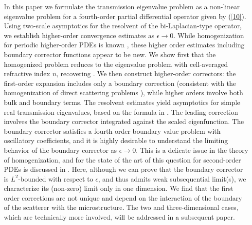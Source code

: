 \documentclass[12pt]{article}
\begin{document}
\medskip
\noindent
In this paper we formulate the transmission eigenvalue problem as a non-linear eigenvalue problem for a fourth-order partial differential operator given by (\ref{10}). Using two-scale asymptotics for the resolvent of the bi-Laplacian-type operator, we establish higher-order convergence estimates as $\epsilon \to 0$. While homogenization for periodic higher-order PDEs is known \cite{ Fr, high2, high,Pa}, these higher order estimates including boundary corrector functions appear to be new. We show first that the homogenized problem reduces to the eigenvalue problem with cell-averaged refractive index ${\overline n}$, recovering \cite{CaHaHa}. We then construct higher-order correctors: the first-order expansion includes only a boundary correction (consistent with the homogenization of direct scattering problems \cite{CaMoPa,CaGuMoPa}), while higher orders involve both bulk and boundary terms. The resolvent estimates yield asymptotics for simple real transmission eigenvalues, based on the formula in \cite[Theorem 3.2]{FuMo}. The leading correction involves the  boundary corrector integrated against the scaled eigenfunction. The boundary corrector satisfies a fourth-order boundary value problem with oscillatory coefficients, and it is highly desirable to understand the limiting behavior of  the boundary corrector as $\epsilon \to 0$. This  is a delicate issue in the theory of homogenization, and for the state of the art of this question for second-order PDEs is  discussed in \cite{GeMa1, GeMa2, MoVo1, SaVo}. Here, although we can prove that the boundary corrector is $L^2$-bounded with respect to $\epsilon$, and thus admits weak subsequential limit(s), we characterize its (non-zero) limit only in one dimension. We find that the first order corrections are not unique and depend on the interaction of the boundary of
the scatterer with the microstructure.  The two and three-dimensional cases, which are technically more involved, will be addressed in a subsequent paper.  
 
\end{document}
